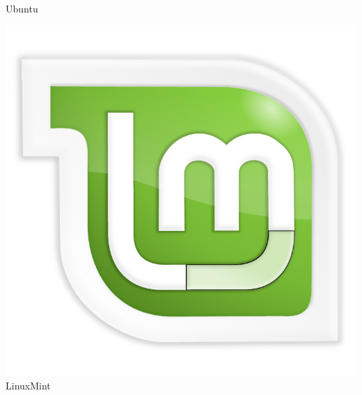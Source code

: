 \documentclass[hyperref={colorlinks}]{beamer}
\begin{document}
\begin{frame}
\begin{minipage}[b][.20\textheight][t]{.20\textwidth}
    \centering Ubuntu
    \end{minipage}\hfill
    \begin{minipage}[b][.20\textheight][t]{.20\textwidth}
    \includegraphics[width=.7\textwidth]{figs/logo-linuxmint.pdf}\\
    \centering LinuxMint
    \end{minipage}\\[1cm]


\end{frame}
\end{document}
